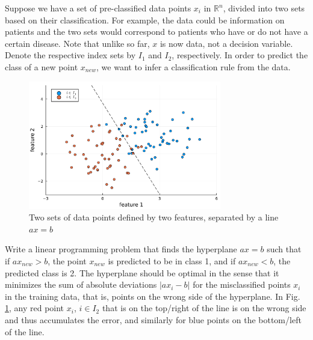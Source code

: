 Suppose we have a set of pre-classified data points $x_i$ in $\mathbb{R}^n$, divided into two sets based on their classification. For example, the data could be information on patients and the two sets would correspond to patients who have or do not have a certain disease. Note that unlike so far, $x$ is now data, not a decision variable. Denote the respective index sets by $I_1$ and $I_2$, respectively. In order to predict the class of a new point $x_{new}$, we want to infer a classification rule from the data.
\begin{figure}
    \includegraphics[width=0.75\textwidth]{part_1/chapter_1/figures/figure_e16.pdf}
    \caption{Two sets of data points defined by two features, separated by a line $ax=b$} 
    \label{p1c1:fig:fig_e16}		
\end{figure}

Write a linear programming problem that finds the hyperplane $ax = b$ such that if $ax_{new} > b$, the point $x_{new}$ is predicted to be in class 1, and if $ax_{new}<b$, the predicted class is 2. The hyperplane should be optimal in the sense that it minimizes the sum of absolute deviations $|ax_i-b|$ for the misclassified points $x_i$ in the training data, that is, points on the wrong side of the hyperplane. In Fig. \ref{p1c1:fig:fig_e16}, any red point $x_i$, $i \in I_2$ that is on the top/right of the line is on the wrong side and thus accumulates the error, and similarly for blue points on the bottom/left of the line.
